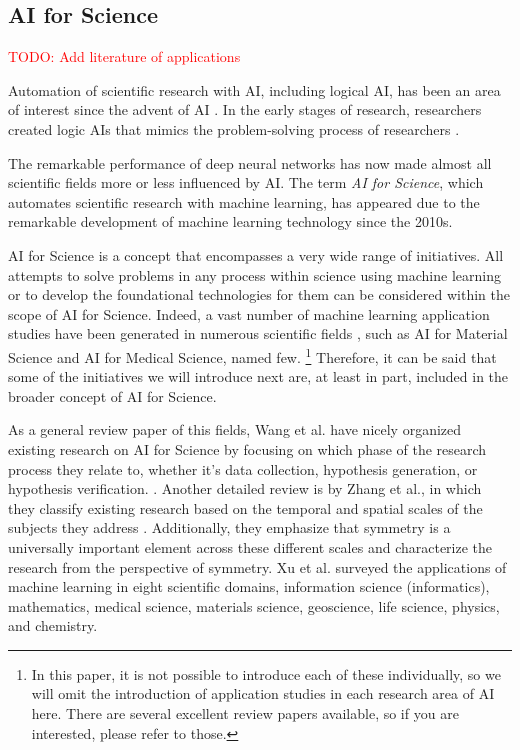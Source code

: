 \documentclass{article}
\begin{document}
\subsection{AI for Science}

\textcolor{red}{TODO: Add literature of applications}

Automation of scientific research with AI, including logical AI, has been an area of interest since the advent of AI \cite{langley1987scientific}. In the early stages of research, researchers created logic AIs that mimics the problem-solving process of researchers \cite{lindsay1993dendral}.

The remarkable performance of deep neural networks has now made almost all scientific fields more or less influenced by AI. The term \textit{AI for Science}, which automates scientific research with machine learning, has appeared due to the remarkable development of machine learning technology since the 2010s. 

AI for Science is a concept that encompasses a very wide range of initiatives. All attempts to solve problems in any process within science using machine learning or to develop the foundational technologies for them can be considered within the scope of AI for Science. Indeed, a vast number of machine learning application studies have been generated in numerous scientific fields \cite{xu2021artificial}, such as AI for Material Science and AI for Medical Science, named few.
\footnote{In this paper, it is not possible to introduce each of these individually, so we will omit the introduction of application studies in each research area of AI here. There are several excellent review papers available, so if you are interested, please refer to those.}
Therefore, it can be said that some of the initiatives we will introduce next are, at least in part, included in the broader concept of AI for Science.

As a general review paper of this fields, Wang et al. have nicely organized existing research on AI for Science by focusing on which phase of
the research process they relate to, whether it’s data collection, hypothesis generation, or hypothesis
verification. \cite{wang2023scientific}. Another detailed review is by Zhang et al., in which they classify existing research based on the temporal and spatial scales of the subjects they address \cite{zhang2023artificial}. Additionally, they emphasize that symmetry is a universally important element across
these different scales and characterize the research from the perspective of symmetry. Xu et al. \cite{xu2021artificial} surveyed the applications of machine learning in eight scientific domains, information science (informatics), mathematics, medical science,
materials science, geoscience, life science, physics, and chemistry.
\end{document}

